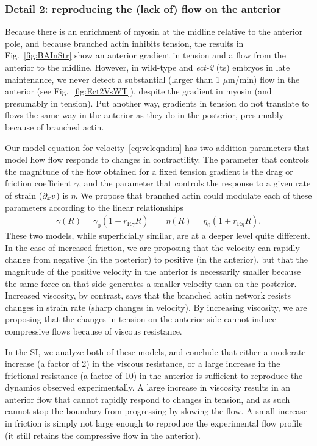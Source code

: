 \documentclass[11pt]{article}
\newcommand{\6}[1]{#1_{\text{6}}}
\newcommand{\3}[1]{#1_{\text{3}}}
\begin{document}
\subsubsection{Detail 2: reproducing the (lack of) flow on the anterior}
Because there is an enrichment of myosin at the midline relative to the anterior pole, and because branched actin inhibits tension, the results in Fig.\ \ref{fig:BAInStr} show an anterior gradient in tension and a flow from the anterior to the midline. However, in wild-type and \emph{ect-2} (ts) embryos in late maintenance, we never detect a substantial (larger than 1 $\mu$m/min) flow in the anterior (see Fig.\ \ref{fig:Ect2VsWT}), despite the gradient in myosin (and presumably in tension). Put another way, gradients in tension do not translate to flows the same way in the anterior as they do in the posterior, presumably because of branched actin.

Our model equation for velocity\ \eqref{eq:veleqndim} has two addition parameters that model how flow responds to changes in contractility. The parameter that controls the magnitude of the flow obtained for a fixed tension gradient is the drag or friction coefficient $\gamma$, and the parameter that controls the response to a given rate of strain ($\partial_x v$) is $\eta$. We propose that branched actin could modulate each of these parameters according to the linear relationships
\begin{gather*}
\gamma(R)=\gamma_0 \left(1+r_\text{R$\gamma$}R\right) \qquad \eta(R)=\eta_0\left(1+r_\text{R$\eta$} R\right).
\end{gather*}
These two models, while superficially similar, are at a deeper level quite different. In the case of increased friction, we are proposing that the velocity can rapidly change from negative (in the posterior) to positive (in the anterior), but that the magnitude of the positive velocity in the anterior is necessarily smaller because the same force on that side generates a smaller velocity than on the posterior. Increased viscosity, by contrast, says that the branched actin network resists changes in strain rate (sharp changes in velocity). By increasing viscosity, we are proposing that the changes in tension on the anterior side cannot induce compressive flows because of viscous resistance.

In the SI, we analyze both of these models, and conclude that either a moderate increase (a factor of 2) in the viscous resistance, or a large increase in the frictional resistance (a factor of 10) in the anterior is sufficient to reproduce the dynamics observed experimentally. A large increase in viscosity results in an anterior flow that cannot rapidly respond to changes in tension, and as such cannot stop the boundary from progressing by slowing the flow. A small increase in friction is simply not large enough to reproduce the experimental flow profile (it still retains the compressive flow in the anterior). 
\end{document}
